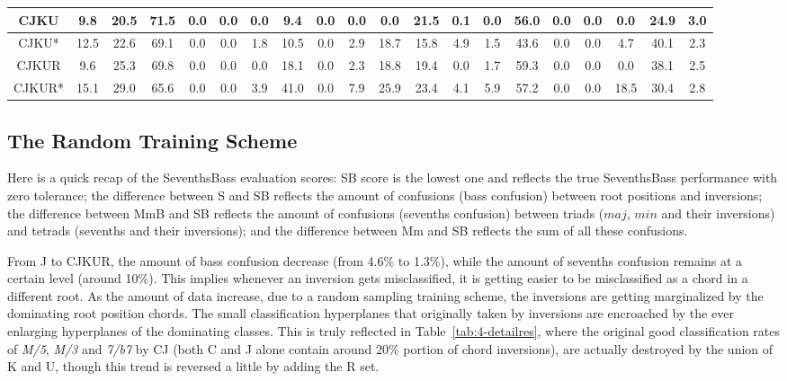\begin{landscape}
\begin{table*}[h]
\begin{tabular}{|c|c|c|c|c|c|c|c|c|c|c|c|c|c|c|c|c|c|c|c|}
CJKU & 9.8 & 20.5 & 71.5 & 0.0 & 0.0 & 0.0 & 9.4 & 0.0 & 0.0 & 0.0 & 21.5 & 0.1 & 0.0 & 56.0 & 0.0 & 0.0 & 0.0 & 24.9 & 3.0\\ \hline
CJKU* & 12.5 & 22.6 & 69.1 & 0.0 & 0.0 & 1.8 & 10.5 & 0.0 & 2.9 & 18.7 & 15.8 & 4.9 & 1.5 & 43.6 & 0.0 & 0.0 & 4.7 & 40.1 & 2.3\\ \hline
CJKUR & 9.6 & 25.3 & 69.8 & 0.0 & 0.0 & 0.0 & 18.1 & 0.0 & 2.3 & 18.8 & 19.4 & 0.0 & 1.7 & 59.3 & 0.0 & 0.0 & 0.0 & 38.1 & 2.5 \\ \hline
CJKUR* & 15.1 & 29.0 & 65.6 & 0.0 & 0.0 & 3.9 & 41.0 & 0.0 & 7.9 & 25.9 & 23.4 & 4.1 & 5.9 & 57.2 & 0.0 & 0.0 & 18.5 & 30.4 & 2.8\\ \hline
\end{tabular}
\end{table*}
\end{landscape}

\subsection{The Random Training Scheme}
Here is a quick recap of the SeventhsBass evaluation scores: SB score is the lowest one and reflects the true SeventhsBass performance with zero tolerance; the difference between S and SB reflects the amount of confusions (bass confusion) between root positions and inversions; the difference between MmB and SB reflects the amount of confusions (sevenths confusion) between triads ($maj$, $min$ and their inversions) and tetrads (sevenths and their inversions); and the difference between Mm and SB reflects the sum of all these confusions.

From J to CJKUR, the amount of bass confusion decrease (from 4.6\% to 1.3\%), while the amount of sevenths confusion remains at a certain level (around 10\%). This implies whenever an inversion gets misclassified, it is getting easier to be misclassified as a chord in a different root. As the amount of data increase, due to a random sampling training scheme, the inversions are getting marginalized by the dominating root position chords. The small classification hyperplanes that originally taken by inversions are encroached by the ever enlarging hyperplanes of the dominating classes. This is truly reflected in Table~\ref{tab:4-detailres}, where the original good classification rates of \textit{M/5}, \textit{M/3} and \textit{7/b7} by CJ (both C and J alone contain around 20\% portion of chord inversions), are actually destroyed by the union of K and U, though this trend is reversed a little by adding the R set.

